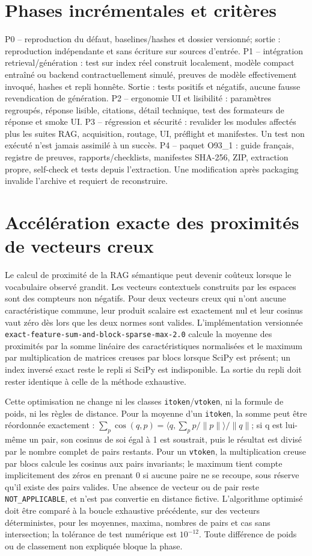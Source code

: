 \documentclass[11pt,a4paper]{article}
\begin{document}
\section{Phases incrémentales et critères}
P0 -- reproduction du défaut, baselines/hashes et dossier versionné; sortie : reproduction indépendante et sans écriture sur sources d'entrée.
P1 -- intégration retrieval/génération : test sur index réel construit localement, modèle compact entraîné ou backend contractuellement simulé, preuves de modèle effectivement invoqué, hashes et repli honnête. Sortie : tests positifs et négatifs, aucune fausse revendication de génération.
P2 -- ergonomie UI et lisibilité : paramètres regroupés, réponse lisible, citations, détail technique, test des formateurs de réponse et smoke UI.
P3 -- régression et sécurité : revalider les modules affectés plus les suites RAG, acquisition, routage, UI, préflight et manifestes. Un test non exécuté n'est jamais assimilé à un succès.
P4 -- paquet O93\_1 : guide français, registre de preuves, rapports/checklists, manifestes SHA-256, ZIP, extraction propre, self-check et tests depuis l'extraction. Une modification après packaging invalide l'archive et requiert de reconstruire.
\section{Accélération exacte des proximités de vecteurs creux}
Le calcul de proximité de la RAG sémantique peut devenir coûteux lorsque le vocabulaire observé grandit. Les vecteurs contextuels construits par les espaces sont des compteurs non négatifs. Pour deux vecteurs creux qui n'ont aucune caractéristique commune, leur produit scalaire est exactement nul et leur cosinus vaut zéro dès lors que les deux normes sont valides. L'implémentation versionnée \texttt{exact-feature-sum-and-block-sparse-max-2.0} calcule la moyenne des proximités par la somme linéaire des caractéristiques normalisées et le maximum par multiplication de matrices creuses par blocs lorsque SciPy est présent; un index inversé exact reste le repli si SciPy est indisponible. La sortie du repli doit rester identique à celle de la méthode exhaustive.

Cette optimisation ne change ni les classes \texttt{itoken}/\texttt{vtoken}, ni la formule de poids, ni les règles de distance. Pour la moyenne d'un \texttt{itoken}, la somme peut être réordonnée exactement : $\sum_p \cos(q,p)=\langle q,\sum_p p/\|p\|\rangle/\|q\|$; si q est lui-même un pair, son cosinus de soi égal à 1 est soustrait, puis le résultat est divisé par le nombre complet de pairs restants. Pour un \texttt{vtoken}, la multiplication creuse par blocs calcule les cosinus aux pairs invariants; le maximum tient compte implicitement des zéros en prenant $0$ si aucune paire ne se recoupe, sous réserve qu'il existe des pairs valides. Une absence de vecteur ou de pair reste \texttt{NOT\_APPLICABLE}, et n'est pas convertie en distance fictive. L'algorithme optimisé doit être comparé à la boucle exhaustive précédente, sur des vecteurs déterministes, pour les moyennes, maxima, nombres de pairs et cas sans intersection; la tolérance de test numérique est $10^{-12}$. Toute différence de poids ou de classement non expliquée bloque la phase.
\end{document}
